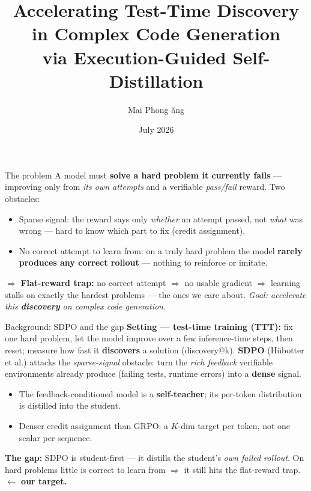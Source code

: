 \documentclass[10pt,aspectratio=169]{beamer}
\title[Execution-Guided Self-Distillation]{Accelerating Test-Time Discovery in Complex Code Generation\\via Execution-Guided Self-Distillation}
\author[Mai Phong \DJ\u{a}ng]{Mai Phong \DJ\u{a}ng}
\institute[VNUHCM-US]{VNUHCM University of Science \\ \small Supervisor: Dr.\ Ng\^{o} Minh M\~{\^{a}}n}
\date{July 2026}
\begin{document}
\begin{frame}\titlepage\end{frame}

\begin{frame}{The problem}
A model must \textbf{solve a hard problem it currently fails} --- improving only from \emph{its own attempts} and a verifiable \emph{pass/fail} reward.
\vfill
Two obstacles:
\begin{itemize}
  \item \alert{Sparse signal:} the reward says only \emph{whether} an attempt passed, not \emph{what} was wrong --- hard to know which part to fix (credit assignment).
  \item \alert{No correct attempt to learn from:} on a truly hard problem the model \textbf{rarely produces any correct rollout} --- nothing to reinforce or imitate.
\end{itemize}
\vfill
$\Rightarrow$ \textbf{Flat-reward trap:} no correct attempt $\Rightarrow$ no usable gradient $\Rightarrow$ learning \alert{stalls on exactly the hardest problems} --- the ones we care about.
\vfill
\centering\emph{Goal: accelerate this \textbf{discovery} on complex code generation.}
\end{frame}

\begin{frame}{Background: SDPO and the gap}
\textbf{Setting --- test-time training (TTT):} fix one hard problem, let the model improve over a few inference-time steps, then reset; measure how fast it \textbf{discovers} a solution (discovery@k).
\vfill
\textbf{SDPO} (H\"ubotter et al.) attacks the \emph{sparse-signal} obstacle: turn the \emph{rich feedback} verifiable environments already produce (failing tests, runtime errors) into a \textbf{dense} signal.
\begin{itemize}
  \item The feedback-conditioned model is a \textbf{self-teacher}; its per-token distribution is distilled into the student.
  \item Denser credit assignment than GRPO: a $K$-dim target per token, not one scalar per sequence.
\end{itemize}
\vfill
\textbf{The gap:} SDPO is \alert{student-first} --- it distills the student's \emph{own failed rollout}. On hard problems little is correct to learn from $\Rightarrow$ it still hits the flat-reward trap. \textbf{$\leftarrow$ our target.}
\end{frame}
\end{document}
